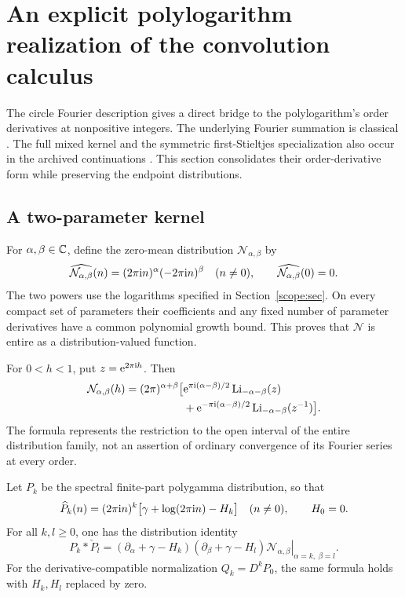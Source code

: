 \section{An explicit polylogarithm realization of the convolution calculus}
\label{poly:sec}

The circle Fourier description gives a direct bridge to the
polylogarithm's order derivatives at nonpositive integers. The underlying
Fourier summation is classical \cite{DLMFPolylog,DLMFHurwitz}.
The full mixed kernel and the symmetric first-Stieltjes specialization
also occur in the archived continuations
\cite{RepoConvolutionAlgebra,RepoConvolutionCalculus}.
This section consolidates their order-derivative form while preserving
the endpoint distributions.

\subsection{A two-parameter kernel}

For \(\alpha,\beta\in\mathbb C\), define the zero-mean distribution
\(\mathcal N_{\alpha,\beta}\) by
\begin{equation}\label{poly:N-fourier}
 \widehat{\mathcal N_{\alpha,\beta}}(n)=
 (2\pi\mathrm i n)^\alpha(-2\pi\mathrm i n)^\beta\quad(n\ne0),
 \qquad \widehat{\mathcal N_{\alpha,\beta}}(0)=0.
\end{equation}
The two powers use the logarithms specified in Section~\ref{scope:sec}.
On every compact set of parameters their coefficients and any fixed
number of parameter derivatives have a common polynomial growth
bound. This proves that \(\mathcal N\) is entire as a
distribution-valued function.

\begin{theorem}
\label{poly:master}
For \(0<h<1\), put \(z=\mathrm e^{2\pi\mathrm i h}\). Then
\begin{align}\label{poly:N}
 \mathcal N_{\alpha,\beta}(h)
 =(2\pi)^{\alpha+\beta}\bigl[
 &\mathrm e^{\pi\mathrm i(\alpha-\beta)/2}
                 \operatorname{Li}_{-\alpha-\beta}(z)\notag\\
 &+\mathrm e^{-\pi\mathrm i(\alpha-\beta)/2}
                 \operatorname{Li}_{-\alpha-\beta}(z^{-1})\bigr].
\end{align}
The formula represents the restriction to the open interval of the
entire distribution family, not an assertion of ordinary convergence
of its Fourier series at every order.

Let \(P_k\) be the spectral finite-part polygamma distribution, so that
\[
 \widehat P_k(n)=(2\pi\mathrm i n)^k
  \bigl[\gamma+\log(2\pi\mathrm i n)-H_k\bigr]\quad(n\ne0),
 \qquad H_0=0.
\]
For all \(k,l\geq0\), one has the distribution identity
\begin{equation}\label{poly:mixed}
 P_k*\check P_l=
 \left.
 (\partial_\alpha+\gamma-H_k)
 (\partial_\beta+\gamma-H_l)
       \mathcal N_{\alpha,\beta}
 \right|_{\alpha=k,\ \beta=l}.
\end{equation}
For the derivative-compatible normalization \(Q_k=D^kP_0\), the same
formula holds with \(H_k,H_l\) replaced by zero.
\end{theorem}

